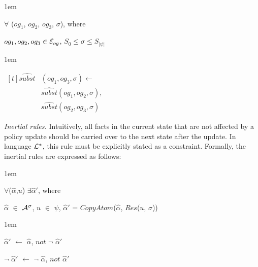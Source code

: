 \documentclass[global,twocolumn,final]{svjour}
\newenvironment{vquote}
  {\begin{list}{}{\leftmargin 1em}\item[]}
  {\end{list}}
\begin{document}
\begin{itemize}
\begin{enumerate}
                  \begin{vquote}
                    $\forall$ ($og_{1}$, $og_{2}$, $og_{3}$, $\sigma$),
                    where

                    $og_{1}, og_{2}, og_{3} \in {\cal E}_{og}$,
                    $S_{0} \leq \sigma \leq S_{|\psi|}$
                  \end{vquote}

                  \begin{vquote}
                    \begin{math}
                      \begin{aligned}[t]
                        \hat{subst}&(og_{1}, og_{3}, \sigma) \leftarrow \\
                        & \hat{subst}(og_{1}, og_{2}, \sigma), \\
                        & \hat{subst}(og_{2}, og_{3}, \sigma)
                      \end{aligned}
                    \end{math}
                  \end{vquote}
               \end{enumerate}

            \item
              {\em Inertial rules.}
              Intuitively, all facts in the current state that are not affected
              by a policy update should be carried over to the next state after
              the update. In language ${\cal L}^{*}$, this rule must be
              explicitly stated as a constraint. Formally, the inertial rules
              are expressed as follows:

              \begin{vquote}
                $\forall$($\hat{\alpha}$,$u$) $\exists$$\hat{\alpha}'$,
                where

                $\hat{\alpha}$ $\in$ ${\cal A}^{\sigma}$,
                $u$ $\in$ $\psi$,
                $\hat{\alpha}'$ = $CopyAtom$($\hat{\alpha}$, $Res$($u$, $\sigma$))
              \end{vquote}

              \begin{vquote}
                $\hat{\alpha}'$ $\leftarrow$ $\hat{\alpha}$, $not$ $\lnot$ $\hat{\alpha}'$

                $\lnot$ $\hat{\alpha}'$ $\leftarrow$ $\lnot$ $\hat{\alpha}$, $not$ $\hat{\alpha}'$
              \end{vquote}
          \end{itemize}
\end{document}
